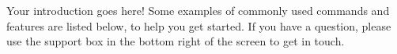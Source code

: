 \documentclass[main.tex]{subfiles}
\begin{document}
Your introduction goes here! Some examples of commonly used commands and features are listed below, to help you get started.
If you have a question, please use the support box in the bottom right of the screen to get in touch.
\end{document}
